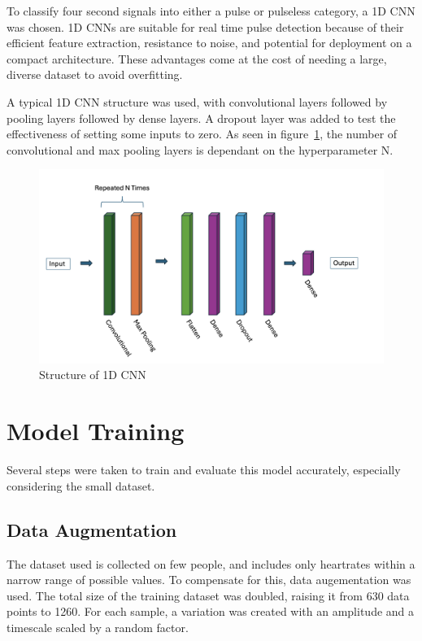 \documentclass{article}
\begin{document}
To classify four second signals into either a pulse or pulseless category, a 1D CNN was chosen. 1D CNNs are suitable for real time pulse detection because of their efficient feature extraction, resistance to noise, and potential for deployment on a compact architecture. These advantages come at the cost of needing a large, diverse dataset to avoid overfitting.

A typical 1D CNN structure was used, with convolutional layers followed by pooling layers followed by dense layers. A dropout layer was added to test the effectiveness of setting some inputs to zero. As seen in figure~\ref{fig:model}, the number of convolutional and max pooling layers is dependant on the hyperparameter N.

\begin{figure}[H]
    \centering
    \includegraphics[width=1.0\textwidth]{../media/model.png}
    \caption{Structure of 1D CNN}
    \label{fig:model}
\end{figure}


\section{Model Training}


Several steps were taken to train and evaluate this model accurately, especially considering the small dataset.

\subsection{Data Augmentation}

The dataset used is collected on few people, and includes only heartrates within a narrow range of possible values. To compensate for this, data augementation was used. The total size of the training dataset was doubled, raising it from 630 data points to 1260. For each sample, a variation was created with an amplitude and a timescale scaled by a random factor.
\end{document}
